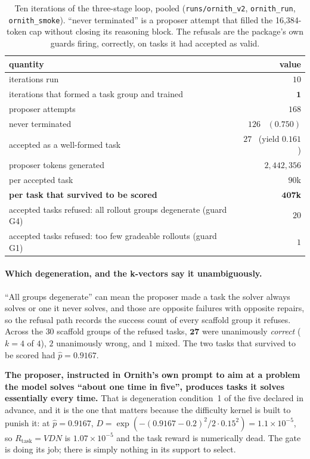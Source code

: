 \begin{table}[t]
\centering\small
\caption{Ten iterations of the three-stage loop, pooled (\texttt{runs/ornith\_v2},
\texttt{ornith\_run}, \texttt{ornith\_smoke}). ``never terminated'' is a proposer attempt that
filled the 16{,}384-token cap without closing its reasoning block. The refusals are the
package's own guards firing, correctly, on tasks it had accepted as valid.}
\label{tab:ornithloop}
\begin{tabular}{lr}
\toprule
quantity & value \\
\midrule
iterations run                                     & $10$ \\
iterations that formed a task group and trained    & $\mathbf{1}$ \\
proposer attempts                                  & $168$ \\
\quad never terminated                             & $126$ \ $(0.750)$ \\
\quad accepted as a well-formed task               & $27$ \ (yield $0.161$) \\
proposer tokens generated                          & $2{,}442{,}356$ \\
\quad per accepted task                            & $90$k \\
\quad \textbf{per task that survived to be scored} & $\mathbf{407}$\textbf{k} \\
\addlinespace
accepted tasks refused: all rollout groups degenerate (guard G4) & $20$ \\
accepted tasks refused: too few gradeable rollouts (guard G1)    & $1$ \\
\bottomrule
\end{tabular}
\end{table}

\paragraph{Which degeneration, and the k-vectors say it unambiguously.}
``All groups degenerate'' can mean the proposer made a task the solver always solves or one it
never solves, and those are opposite failures with opposite repairs, so the refusal path records
the success count of every scaffold group it refuses. Across the $30$ scaffold groups of the
refused tasks, $\mathbf{27}$ were unanimously \emph{correct} ($k=4$ of $4$), $2$ unanimously
wrong, and $1$ mixed. The two tasks that survived to be scored had $\hat p = 0.9167$.

\textbf{The proposer, instructed in Ornith's own prompt to aim at a problem the model solves
``about one time in five'', produces tasks it solves essentially every time.} That is
degeneration condition~1 of the five declared in advance, and it is the one that matters
because the difficulty kernel is built to punish it: at $\hat p = 0.9167$,
$D=\exp(-(0.9167-0.2)^2/2\cdot0.15^2) = 1.1\times10^{-5}$, so $R_{\mathrm{task}}=V D N$ is
$1.07\times10^{-5}$ and the task reward is numerically dead. The gate is doing its job; there
is simply nothing in its support to select.

